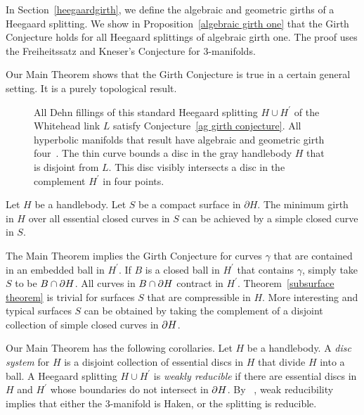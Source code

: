 In Section~\ref{heegaardgirth}, we define the algebraic and geometric girths of a Heegaard splitting.  We show in Proposition~\ref{algebraic girth one} that the Girth Conjecture holds for all Heegaard splittings of algebraic girth one.  The proof uses the Freiheitssatz and Kneser's Conjecture for 3-manifolds.

Our Main Theorem shows that the Girth Conjecture is true in a certain general setting.  It is a purely topological result.

\begin{figure}
\caption{
All Dehn fillings of this standard Heegaard splitting $H\cup H^\prime$
of the Whitehead link $L$ satisfy 
Conjecture~\ref{ag girth conjecture}.
All hyperbolic manifolds that result have algebraic and
geometric girth four~\cite{Je2}. 
The thin curve bounds a disc in the gray handlebody $H$ that is disjoint from $L$.  This disc visibly intersects a disc in the complement $H^\prime$ 
in four points.}
\label{whitehead}
\end{figure}

\begin{subsurface theorem}
Let $H$ be a handlebody.  Let $S$ be a compact surface in 
$\partial H$.  The minimum girth in $H$ over all essential closed
curves in $S$ can be achieved by a simple closed curve in $S$. 
\end{subsurface theorem}

The Main Theorem implies the Girth Conjecture for curves $\gamma$ that are contained in an embedded ball in $H^\prime$.  If $B$ is a closed ball in $H^{\prime}$ that contains $\gamma$, simply take $S$ to be $B\cap \partial H$.  All curves in $B\cap \partial H$ contract in $H^{\prime}$.  Theorem~\ref{subsurface theorem} is trivial for surfaces $S$ that are compressible in $H$.  More interesting and typical surfaces $S$ can be obtained by taking the complement of a disjoint collection of simple closed curves in $\partial H$.

Our Main Theorem has the following corollaries.
Let $H$ be a handlebody.
A \emph{disc system} for $H$ is a disjoint collection of essential 
discs in $H$ that divide $H$ into a ball.
A Heegaard splitting $H\cup H^\prime$ is \emph{weakly reducible}
if there are essential discs in $H$ and $H^\prime$ whose
boundaries do not intersect in $\partial H$.  By ~\cite{CG}, weak
reducibility implies that either the 3-manifold is Haken,
or the splitting is reducible.


